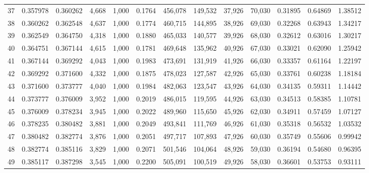 \begin{tabular}{rrrrrrrrrrrrr}
37  &  0.357978 &  0.360262 &   4,668 &  1,000 &                                     0.1764 &  456,078 &  149,532 &   37,926 &   70,030 &  0.31895 &  0.64869 &  1.38512 \\
38  &  0.360262 &  0.362548 &   4,637 &  1,000 &                                     0.1774 &  460,715 &  144,895 &   38,926 &   69,030 &  0.32268 &  0.63943 &  1.34217 \\
39  &  0.362549 &  0.364750 &   4,318 &  1,000 &                                     0.1880 &  465,033 &  140,577 &   39,926 &   68,030 &  0.32612 &  0.63016 &  1.30217 \\
40  &  0.364751 &  0.367144 &   4,615 &  1,000 &                                     0.1781 &  469,648 &  135,962 &   40,926 &   67,030 &  0.33021 &  0.62090 &  1.25942 \\
41  &  0.367144 &  0.369292 &   4,043 &  1,000 &                                     0.1983 &  473,691 &  131,919 &   41,926 &   66,030 &  0.33357 &  0.61164 &  1.22197 \\
42  &  0.369292 &  0.371600 &   4,332 &  1,000 &                                     0.1875 &  478,023 &  127,587 &   42,926 &   65,030 &  0.33761 &  0.60238 &  1.18184 \\
43  &  0.371600 &  0.373777 &   4,040 &  1,000 &                                     0.1984 &  482,063 &  123,547 &   43,926 &   64,030 &  0.34135 &  0.59311 &  1.14442 \\
44  &  0.373777 &  0.376009 &   3,952 &  1,000 &                                     0.2019 &  486,015 &  119,595 &   44,926 &   63,030 &  0.34513 &  0.58385 &  1.10781 \\
45  &  0.376009 &  0.378234 &   3,945 &  1,000 &                                     0.2022 &  489,960 &  115,650 &   45,926 &   62,030 &  0.34911 &  0.57459 &  1.07127 \\
46  &  0.378235 &  0.380482 &   3,881 &  1,000 &                                     0.2049 &  493,841 &  111,769 &   46,926 &   61,030 &  0.35318 &  0.56532 &  1.03532 \\
47  &  0.380482 &  0.382774 &   3,876 &  1,000 &                                     0.2051 &  497,717 &  107,893 &   47,926 &   60,030 &  0.35749 &  0.55606 &  0.99942 \\
48  &  0.382774 &  0.385116 &   3,829 &  1,000 &                                     0.2071 &  501,546 &  104,064 &   48,926 &   59,030 &  0.36194 &  0.54680 &  0.96395 \\
49  &  0.385117 &  0.387298 &   3,545 &  1,000 &                                     0.2200 &  505,091 &  100,519 &   49,926 &   58,030 &  0.36601 &  0.53753 &  0.93111 \\

\end{tabular}

